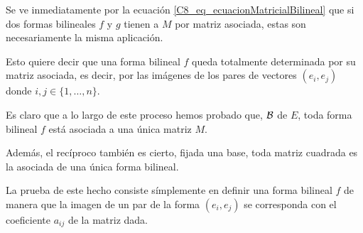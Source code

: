 Se ve inmediatamente por la ecuación \eqref{C8_eq_ecuacionMatricialBilineal} que si dos formas bilineales $f$ y $g$ tienen a $M$ por matriz asociada, estas son necesariamente la misma aplicación.

Esto quiere decir que una forma bilineal $f$ queda totalmente determinada por su matriz asociada, es decir, por las imágenes de los pares de vectores $(e_i,e_j)$ donde $i,j\in\{1,\dots,n\}$.

\begin{obs}
	Es claro que a lo largo de este proceso hemos probado que,  $\mathcal{B}$ de $E$, toda forma bilineal $f$ está asociada a una única matriz $M$.
	
	Además, el recíproco también es cierto, fijada una base, toda matriz cuadrada es la asociada de una única forma bilineal.
	
	La prueba de este hecho consiste símplemente en definir una forma bilineal $f$ de manera que la imagen de un par de la forma $(e_i,e_j)$ se corresponda con el coeficiente $a_{ij}$ de la matriz dada. 
\end{obs}
